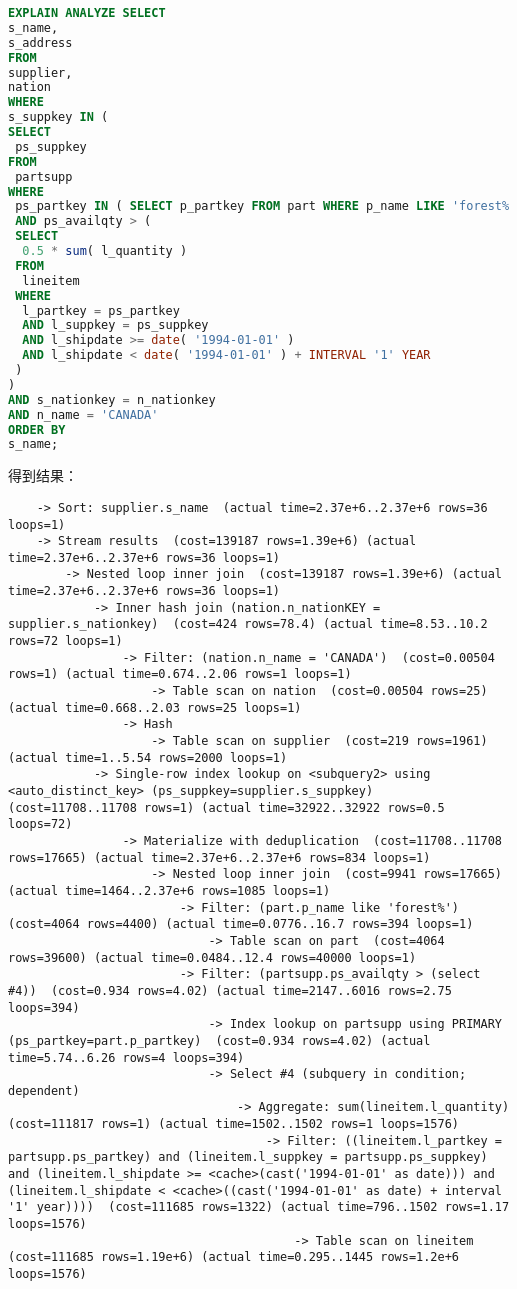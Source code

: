 \documentclass{article}
\begin{document}
\begin{lstlisting}[language=sql]
EXPLAIN ANALYZE SELECT
s_name,
s_address 
FROM
supplier,
nation 
WHERE
s_suppkey IN (
SELECT
 ps_suppkey 
FROM
 partsupp 
WHERE
 ps_partkey IN ( SELECT p_partkey FROM part WHERE p_name LIKE 'forest%' ) 
 AND ps_availqty > (
 SELECT
  0.5 * sum( l_quantity ) 
 FROM
  lineitem 
 WHERE
  l_partkey = ps_partkey 
  AND l_suppkey = ps_suppkey 
  AND l_shipdate >= date( '1994-01-01' ) 
  AND l_shipdate < date( '1994-01-01' ) + INTERVAL '1' YEAR 
 ) 
) 
AND s_nationkey = n_nationkey 
AND n_name = 'CANADA' 
ORDER BY
s_name;
\end{lstlisting}

得到结果：

\begin{lstlisting}
    -> Sort: supplier.s_name  (actual time=2.37e+6..2.37e+6 rows=36 loops=1)
    -> Stream results  (cost=139187 rows=1.39e+6) (actual time=2.37e+6..2.37e+6 rows=36 loops=1)
        -> Nested loop inner join  (cost=139187 rows=1.39e+6) (actual time=2.37e+6..2.37e+6 rows=36 loops=1)
            -> Inner hash join (nation.n_nationKEY = supplier.s_nationkey)  (cost=424 rows=78.4) (actual time=8.53..10.2 rows=72 loops=1)
                -> Filter: (nation.n_name = 'CANADA')  (cost=0.00504 rows=1) (actual time=0.674..2.06 rows=1 loops=1)
                    -> Table scan on nation  (cost=0.00504 rows=25) (actual time=0.668..2.03 rows=25 loops=1)
                -> Hash
                    -> Table scan on supplier  (cost=219 rows=1961) (actual time=1..5.54 rows=2000 loops=1)
            -> Single-row index lookup on <subquery2> using <auto_distinct_key> (ps_suppkey=supplier.s_suppkey)  (cost=11708..11708 rows=1) (actual time=32922..32922 rows=0.5 loops=72)
                -> Materialize with deduplication  (cost=11708..11708 rows=17665) (actual time=2.37e+6..2.37e+6 rows=834 loops=1)
                    -> Nested loop inner join  (cost=9941 rows=17665) (actual time=1464..2.37e+6 rows=1085 loops=1)
                        -> Filter: (part.p_name like 'forest%')  (cost=4064 rows=4400) (actual time=0.0776..16.7 rows=394 loops=1)
                            -> Table scan on part  (cost=4064 rows=39600) (actual time=0.0484..12.4 rows=40000 loops=1)
                        -> Filter: (partsupp.ps_availqty > (select #4))  (cost=0.934 rows=4.02) (actual time=2147..6016 rows=2.75 loops=394)
                            -> Index lookup on partsupp using PRIMARY (ps_partkey=part.p_partkey)  (cost=0.934 rows=4.02) (actual time=5.74..6.26 rows=4 loops=394)
                            -> Select #4 (subquery in condition; dependent)
                                -> Aggregate: sum(lineitem.l_quantity)  (cost=111817 rows=1) (actual time=1502..1502 rows=1 loops=1576)
                                    -> Filter: ((lineitem.l_partkey = partsupp.ps_partkey) and (lineitem.l_suppkey = partsupp.ps_suppkey) and (lineitem.l_shipdate >= <cache>(cast('1994-01-01' as date))) and (lineitem.l_shipdate < <cache>((cast('1994-01-01' as date) + interval '1' year))))  (cost=111685 rows=1322) (actual time=796..1502 rows=1.17 loops=1576)
                                        -> Table scan on lineitem  (cost=111685 rows=1.19e+6) (actual time=0.295..1445 rows=1.2e+6 loops=1576)
\end{lstlisting}
\end{document}
